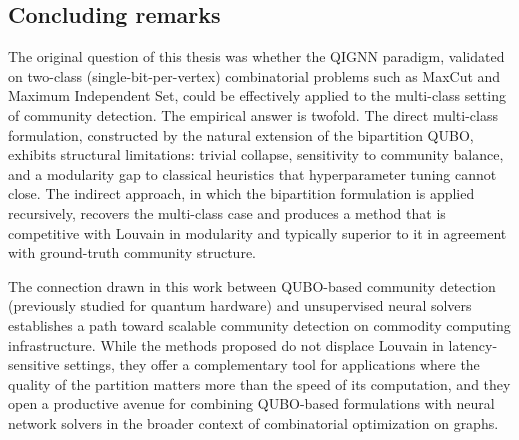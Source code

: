 \subsection{Concluding remarks}
\label{sec:final}

The original question of this thesis was whether the QIGNN
paradigm, validated on two-class (single-bit-per-vertex) combinatorial problems such as
MaxCut and Maximum Independent Set, could be effectively applied
to the multi-class setting of community detection. The empirical
answer is twofold. The direct multi-class formulation,
constructed by the natural extension of the bipartition QUBO,
exhibits structural limitations: trivial collapse, sensitivity
to community balance, and a modularity gap to classical
heuristics that hyperparameter tuning cannot close. The
indirect approach, in which the bipartition formulation is
applied recursively, recovers the multi-class case and produces
a method that is competitive with Louvain in modularity and
typically superior to it in agreement with ground-truth
community structure.

The connection drawn in this work between QUBO-based community
detection (previously studied for quantum hardware) and
unsupervised neural solvers establishes a path toward scalable
community detection on commodity computing infrastructure. While
the methods proposed do not displace Louvain in
latency-sensitive settings, they offer a complementary tool for
applications where the quality of the partition matters more than
the speed of its computation, and they open a productive avenue
for combining QUBO-based formulations with neural network
solvers in the broader context of combinatorial optimization on
graphs.

\newpage
